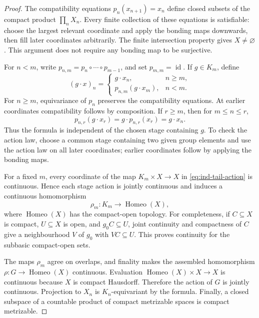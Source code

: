 \begin{proof}
The compatibility equations $p_n(x_{n+1})=x_n$ define closed subsets
of the compact product $\prod_nX_n$. Every finite collection of these
equations is satisfiable: choose the largest relevant coordinate and
apply the bonding maps downwards, then fill later coordinates
arbitrarily. The finite intersection property gives $X\ne\varnothing$.
This argument does not require any bonding map to be surjective.

For $n<m$, write $p_{n,m}=p_n\circ\cdots\circ p_{m-1}$, and set
$p_{m,m}=\operatorname{id}$. If $g\in K_m$, define
\begin{equation}\label{eq:ind-tail-action}
(g\cdot x)_n=
\begin{cases}
g\cdot x_n,&n\ge m,\\
p_{n,m}(g\cdot x_m),&n<m.
\end{cases}
\end{equation}
For $n\ge m$, equivariance of $p_n$ preserves the compatibility
equations. At earlier coordinates compatibility follows by composition.
If $r\ge m$, then for $m\le n\le r$,
\[
p_{n,r}(g\cdot x_r)=g\cdot p_{n,r}(x_r)=g\cdot x_n.
\]
Thus the formula is independent of the chosen stage containing $g$.
To check the action law, choose a common stage containing two given
group elements and use the action law on all later coordinates;
earlier coordinates follow by applying the bonding maps.

For a fixed $m$, every coordinate of the map $K_m\times X\to X$ in
\eqref{eq:ind-tail-action} is continuous. Hence each stage action is
jointly continuous and induces a continuous homomorphism
\[
\rho_m:K_m\longrightarrow\operatorname{Homeo}(X),
\]
where $\operatorname{Homeo}(X)$ has the compact-open topology. For completeness,
if $C\subseteq X$ is compact, $U\subseteq X$ is open, and
$g_0C\subseteq U$, joint continuity and compactness of $C$ give a
neighbourhood $V$ of $g_0$ with $VC\subseteq U$. This proves
continuity for the subbasic compact-open sets.

The maps $\rho_m$ agree on overlaps, and finality makes the assembled
homomorphism $\rho:G\to\operatorname{Homeo}(X)$ continuous. Evaluation
$\operatorname{Homeo}(X)\times X\to X$ is continuous because $X$ is compact
Hausdorff. Therefore the action of $G$ is jointly continuous.
Projection to $X_n$ is $K_n$-equivariant by the formula. Finally, a
closed subspace of a countable product of compact metrizable spaces
is compact metrizable.
\end{proof}

